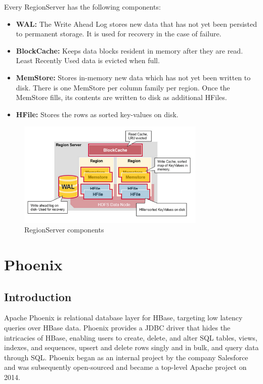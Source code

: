 Every RegionServer has the following components:
\begin{itemize}
\item \textbf{WAL:} The Write Ahead Log stores new data that has not yet been persisted to permanent storage. It is used for recovery in the case of failure.
\item \textbf{BlockCache:} Keeps data blocks resident in memory after they are read. Least Recently Used data is evicted when full.
\item \textbf{MemStore:} Stores in-memory new data which has not yet been written to disk. There is one MemStore per column family per region. Once the MemStore fills, its contents are written to disk as additional HFiles.
\item \textbf{HFile:} Stores the rows as sorted key-values on disk.
\end{itemize}

\begin{figure}[h!]
\centering
\includegraphics[width=0.8\textwidth]{figures/hbase_regionserver_components}
\caption{RegionServer components}
\label{figure:hbase_regionserver_components}
\end{figure}


\section{Phoenix}

\subsection{Introduction}

Apache Phoenix \cite{phoenix} is relational database layer for HBase, targeting low latency queries over HBase data. Phoenix provides a JDBC driver that hides the intricacies of HBase, enabling users to create, delete, and alter SQL tables, views, indexes, and sequences, upsert and delete rows singly and in bulk, and query data through SQL. Phoenix began as an internal project by the company Salesforce and was subsequently open-sourced and became a top-level Apache project on 2014.

